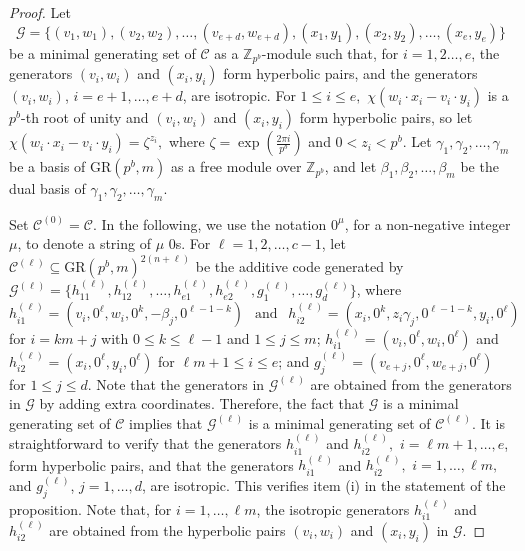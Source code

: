 \documentclass{article}
\DeclareMathOperator{\Tr}{Tr}
\DeclareMathOperator{\rank}{rank}
\theoremstyle{remark}
\theoremstyle{definition}
\numberwithin{equation}{section}
\begin{document}
\begin{proof} Let  $$\mathcal{G}=\{(v_1,w_1),(v_2,w_2),\ldots, (v_{e+d},w_{e+d}),(x_1,y_1),(x_2,y_2),\ldots, (x_{e},y_{e})\}$$ be a minimal generating set of $\mathcal{C}$ as a $\mathbb{Z}_{p^b}$-module such that, for $i = 1,2\ldots,e$, the generators $(v_i,w_i)$ and $(x_i,y_i)$ form hyperbolic pairs, and the generators $(v_i,w_i)$, $i = e+1,\ldots,e+d$, are isotropic. 
For $1 \leq i \leq e,$ $\chi(w_i \cdot x_i-v_i \cdot y_i)$ is a $p^b$-th root of unity and $(v_i,w_i)$ and $(x_i,y_i)$ form hyperbolic pairs, so let $\chi(w_i \cdot x_i-v_i \cdot y_i)=\zeta^{z_{i}},$ where $\zeta = \exp(\frac{2\pi i}{p^b})$ and $0< z_{i} < p^b.$ Let $\gamma_1,\gamma_2,\ldots,\gamma_m$ be a  basis of $\text{GR}(p^b,m)$ as a free module over $\mathbb{Z}_{p^b}$, and let $\beta_1,\beta_2,\ldots,\beta_m$ be the dual basis of $\gamma_1,\gamma_2,\ldots,\gamma_m.$  

Set $\mathcal{C}^{(0)} = \mathcal{C}$. In the following, we use the notation $0^{\mu}$, for a non-negative integer $\mu$, to denote a string of $\mu$ $0$s. For $\ell = 1,2,\ldots,c-1$, let $\mathcal{C}^{(\ell)} \subseteq \text{GR}(p^b,m)^{2(n+\ell)}$ be the additive code generated by $\mathcal{G}^{(\ell)} = \{h^{(\ell)}_{11},h^{(\ell)}_{12},\ldots, h^{(\ell)}_{e1},h^{(\ell)}_{e2},g^{(\ell)}_1,\ldots,g^{(\ell)}_d\}$, where
\begin{equation}
h^{(\ell)}_{i1} = (v_i,0^{\ell},w_i,0^k,-\beta_j,0^{\ell-1-k}) \ \ \text{ and } \ \ h^{(\ell)}_{i2} = (x_i,0^{k}, z_i \gamma_j,0^{\ell-1-k}, y_i,0^{\ell})
\label{eq:hyp2iso}
\end{equation}
for $i = km+j$ with $0 \le k \le \ell-1$ and $1 \le j \le m$; $h^{(\ell)}_{i1} = (v_i,0^{\ell},w_i,0^{\ell})$ and $h^{(\ell)}_{i2} = (x_i,0^{\ell},y_i,0^{\ell})$ for $\ell m + 1 \le i \le e$; and $g^{(\ell)}_j = (v_{e+j},0^{\ell},w_{e+j},0^{\ell})$ for $1 \le j \le d$. Note that the generators in $\mathcal{G}^{(\ell)}$ are obtained from the generators in $\mathcal{G}$ by adding extra coordinates. Therefore, the fact that $\mathcal{G}$ is a minimal generating set of $\mathcal{C}$ implies that $\mathcal{G}^{(\ell)}$ is a minimal generating set of $\mathcal{C}^{(\ell)}$. It is straightforward to verify that the generators $h^{(\ell)}_{i1}$ and $h^{(\ell)}_{i2},$ $i=\ell m+1,\ldots,e$, form hyperbolic pairs, and that the generators $h^{(\ell)}_{i1}$ and $h^{(\ell)}_{i2},$ $i=1,\ldots,\ell m,$ and $g^{(\ell)}_j$, $j = 1,\ldots,d$, are isotropic. 
This verifies item (i) in the statement of the proposition. Note that, for $i=1,\ldots,\ell m$, the isotropic generators $h^{(\ell)}_{i1}$ and $h^{(\ell)}_{i2}$ are obtained from the hyperbolic pairs $(v_i,w_i)$ and $(x_i,y_i)$ in $\mathcal{G}$.


\end{proof}
\end{document}
